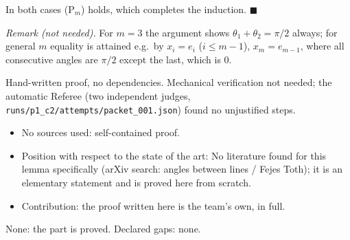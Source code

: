 In both cases (P\(_m\)) holds, which completes the induction.
\(\blacksquare\)

\emph{Remark (not needed).} For \(m=3\) the argument shows
\(\theta_1+\theta_2=\pi/2\) always; for general \(m\) equality is
attained e.g.~by \(x_i=e_i\) (\(i\le m-1\)), \(x_m=e_{m-1}\), where all
consecutive angles are \(\pi/2\) except the last, which is \(0\).


Hand-written proof, no dependencies. Mechanical verification not needed;
the automatic Referee (two independent judges,
\texttt{runs/p1\_c2/attempts/packet\_001.json}) found no unjustified
steps.


\begin{itemize}
\tightlist
\item
  No sources used: self-contained proof.
\item
  Position with respect to the state of the art: No literature found for
  this lemma specifically (arXiv search: angles between lines / Fejes
  Toth); it is an elementary statement and is proved here from scratch.
\item
  Contribution: the proof written here is the team's own, in full.
\end{itemize}


None: the part is proved. Declared gaps: none.

